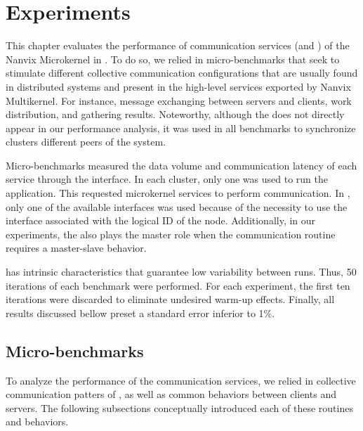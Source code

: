 \chapter{Experiments}
\label{ch.experiments}


	This chapter evaluates the performance of communication services
	(\ie \mailbox and \portal) of the Nanvix Microkernel in \mppa. To do
	so, we relied in micro-benchmarks that seek to stimulate different
	collective communication configurations that are usually found in 
	distributed systems and present in the high-level services exported
	by Nanvix Multikernel. For instance, message exchanging between
	servers and clients, work distribution, and gathering
	results. Noteworthy, although the \sync does not directly appear in
	our performance analysis, it was used in all benchmarks to
	synchronize clusters different peers of the system.

	Micro-benchmarks measured the data volume and communication latency of each
	service through the \ioctl interface. In each cluster, only one  \pe was used
	to run the application. This \pe requested microkernel services to perform
	communication. In \iocluster, only one of the available interfaces was used
	because of the necessity to use the interface associated with the logical ID
	of the node. Additionally, in our experiments, the \iocluster also
	plays the master role when the communication routine requires a
	master-slave behavior.

	\mppa has intrinsic characteristics that guarantee low variability between runs.
	Thus, 50 iterations of each benchmark were performed. For each
	experiment, the first ten iterations
	were discarded to eliminate undesired warm-up effects. Finally, all
	results discussed bellow preset a standard error inferior to 1\%.

	\section{Micro-benchmarks}

		To analyze the performance of the communication services, we
		relied in collective communication patters of \mpi, as well as
		common behaviors between clients and servers. The following
		subsections conceptually introduced each of these routines and
		behaviors.


